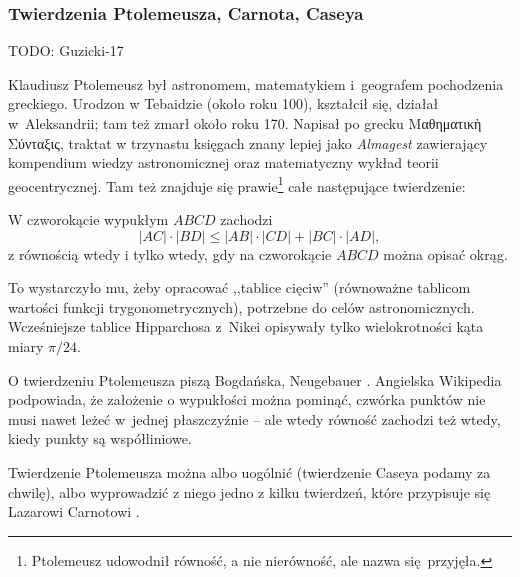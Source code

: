 \subsubsection{Twierdzenia Ptolemeusza, Carnota, Caseya}
{
    \Huge
    \color{red}
    TODO: Guzicki-17
}

Klaudiusz Ptolemeusz był astronomem, matematykiem i~geografem pochodzenia greckiego.
%
Urodzon w Tebaidzie (około roku 100), kształcił się, działał w~Aleksandrii; tam też zmarł około roku 170.
Napisał po grecku Μαθηματικὴ Σύνταξις, traktat w trzynastu księgach znany lepiej jako \emph{Almagest} zawierający kompendium wiedzy astronomicznej oraz matematyczny wykład teorii geocentrycznej.
Tam też znajduje się prawie\footnote{Ptolemeusz udowodnił równość, a nie nierówność, ale nazwa się przyjęła.} całe następujące twierdzenie:

\begin{theorem}[Ptolemeusza, 140 r.n.e.]
%
%
    W czworokącie wypukłym $ABCD$ zachodzi
    \begin{equation}
        |AC| \cdot |BD| \le |AB| \cdot |CD| + |BC| \cdot |AD|,
    \end{equation}
    z równością wtedy i tylko wtedy, gdy na czworokącie $ABCD$ można opisać okrąg.
\end{theorem}

To wystarczyło mu, żeby opracować ,,tablice cięciw'' (równoważne tablicom wartości funkcji trygonometrycznych), potrzebne do celów astronomicznych.
Wcześniejsze tablice Hipparchosa z~Nikei opisywały tylko wielokrotności kąta miary $\pi/24$.
%

O twierdzeniu Ptolemeusza piszą Bogdańska, Neugebauer \cite[s. 62, 63]{neugebauer_2018}.
Angielska Wikipedia podpowiada, że założenie o wypukłości można pominąć, czwórka punktów nie musi nawet leżeć w~jednej płaszczyźnie -- ale wtedy równość zachodzi też wtedy, kiedy punkty są współliniowe.

Twierdzenie Ptolemeusza można albo uogólnić (twierdzenie Caseya podamy za chwilę), albo wyprowadzić z niego jedno z kilku twierdzeń, które przypisuje się Lazarowi Carnotowi \cite{carnot_1803}.

